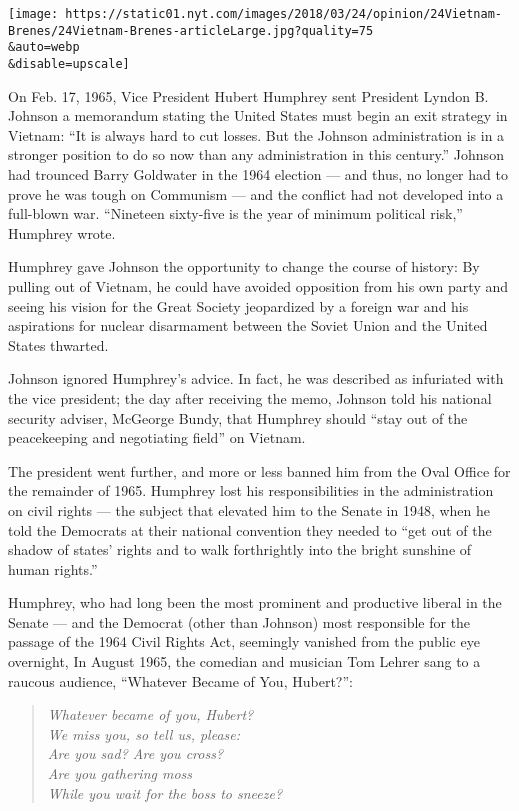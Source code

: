 \texttt{[image: https://static01.nyt.com/images/2018/03/24/opinion/24Vietnam-Brenes/24Vietnam-Brenes-articleLarge.jpg?quality=75\\\&auto=webp\\\&disable=upscale]}

On Feb. 17, 1965, Vice President Hubert Humphrey sent President Lyndon
B. Johnson a memorandum stating the United States must begin an exit
strategy in Vietnam: ``It is always hard to cut losses. But the Johnson
administration is in a stronger position to do so now than any
administration in this century.'' Johnson had trounced Barry Goldwater
in the 1964 election --- and thus, no longer had to prove he was tough
on Communism --- and the conflict had not developed into a full-blown
war. ``Nineteen sixty-five is the year of minimum political risk,''
Humphrey wrote.

Humphrey gave Johnson the opportunity to change the course of history:
By pulling out of Vietnam, he could have avoided opposition from his own
party and seeing his vision for the Great Society jeopardized by a
foreign war and his aspirations for nuclear disarmament between the
Soviet Union and the United States thwarted.

Johnson ignored Humphrey's advice. In fact, he was described as
infuriated with the vice president; the day after receiving the memo,
Johnson told his national security adviser, McGeorge Bundy, that
Humphrey should ``stay out of the peacekeeping and negotiating field''
on Vietnam.

The president went further, and more or less banned him from the Oval
Office for the remainder of 1965. Humphrey lost his responsibilities in
the administration on civil rights --- the subject that elevated him to
the Senate in 1948, when he told the Democrats at their national
convention they needed to ``get out of the shadow of states' rights and
to walk forthrightly into the bright sunshine of human rights.''

Humphrey, who had long been the most prominent and productive liberal in
the Senate --- and the Democrat (other than Johnson) most responsible
for the passage of the 1964 Civil Rights Act, seemingly vanished from
the public eye overnight, In August 1965, the comedian and musician Tom
Lehrer sang to a raucous audience, ``Whatever Became of You, Hubert?'':

\begin{quote}
\emph{Whatever became of you, Hubert?}\\
\emph{We miss you, so tell us, please:}\\
\emph{Are you sad? Are you cross?}\\
\emph{Are you gathering moss}\\
\emph{While you wait for the boss to sneeze?}
\end{quote}

